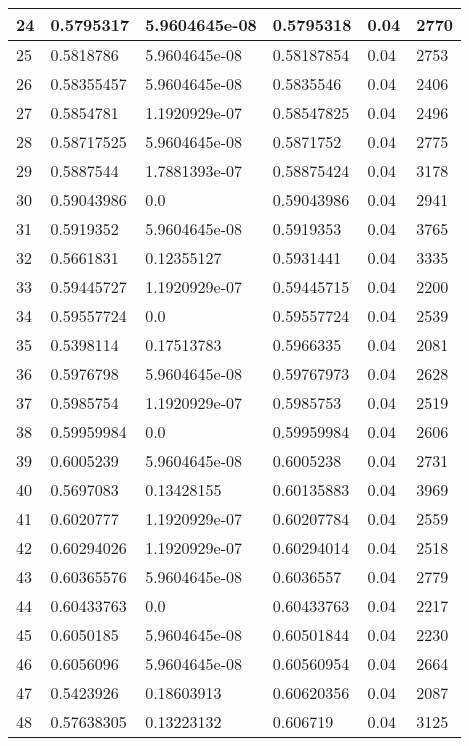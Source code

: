 \begin{longtable}{|l|l|l|l|l|l|}
24 & 0.5795317 & 5.9604645e-08 & 0.5795318 & 0.04 & 2770 \\ \hline 
25 & 0.5818786 & 5.9604645e-08 & 0.58187854 & 0.04 & 2753 \\ \hline 
26 & 0.58355457 & 5.9604645e-08 & 0.5835546 & 0.04 & 2406 \\ \hline 
27 & 0.5854781 & 1.1920929e-07 & 0.58547825 & 0.04 & 2496 \\ \hline 
28 & 0.58717525 & 5.9604645e-08 & 0.5871752 & 0.04 & 2775 \\ \hline 
29 & 0.5887544 & 1.7881393e-07 & 0.58875424 & 0.04 & 3178 \\ \hline 
30 & 0.59043986 & 0.0 & 0.59043986 & 0.04 & 2941 \\ \hline 
31 & 0.5919352 & 5.9604645e-08 & 0.5919353 & 0.04 & 3765 \\ \hline 
32 & 0.5661831 & 0.12355127 & 0.5931441 & 0.04 & 3335 \\ \hline 
33 & 0.59445727 & 1.1920929e-07 & 0.59445715 & 0.04 & 2200 \\ \hline 
34 & 0.59557724 & 0.0 & 0.59557724 & 0.04 & 2539 \\ \hline 
35 & 0.5398114 & 0.17513783 & 0.5966335 & 0.04 & 2081 \\ \hline 
36 & 0.5976798 & 5.9604645e-08 & 0.59767973 & 0.04 & 2628 \\ \hline 
37 & 0.5985754 & 1.1920929e-07 & 0.5985753 & 0.04 & 2519 \\ \hline 
38 & 0.59959984 & 0.0 & 0.59959984 & 0.04 & 2606 \\ \hline 
39 & 0.6005239 & 5.9604645e-08 & 0.6005238 & 0.04 & 2731 \\ \hline 
40 & 0.5697083 & 0.13428155 & 0.60135883 & 0.04 & 3969 \\ \hline 
41 & 0.6020777 & 1.1920929e-07 & 0.60207784 & 0.04 & 2559 \\ \hline 
42 & 0.60294026 & 1.1920929e-07 & 0.60294014 & 0.04 & 2518 \\ \hline 
43 & 0.60365576 & 5.9604645e-08 & 0.6036557 & 0.04 & 2779 \\ \hline 
44 & 0.60433763 & 0.0 & 0.60433763 & 0.04 & 2217 \\ \hline 
45 & 0.6050185 & 5.9604645e-08 & 0.60501844 & 0.04 & 2230 \\ \hline 
46 & 0.6056096 & 5.9604645e-08 & 0.60560954 & 0.04 & 2664 \\ \hline 
47 & 0.5423926 & 0.18603913 & 0.60620356 & 0.04 & 2087 \\ \hline 
48 & 0.57638305 & 0.13223132 & 0.606719 & 0.04 & 3125 \\ \hline 

\end{longtable}
